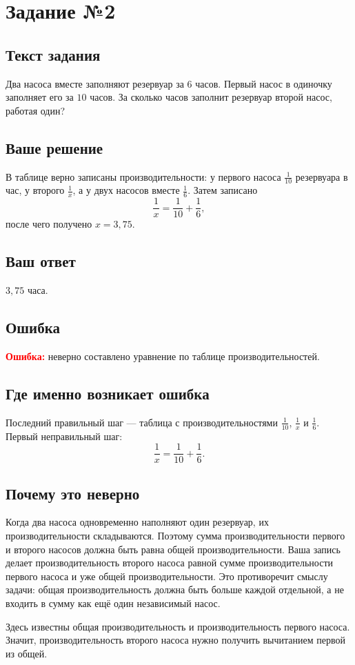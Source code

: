 \documentclass[12pt,a4paper]{article}
\newcommand{\err}{\textcolor{red}{\textbf{Ошибка:}}}
\newcommand{\tasksection}[1]{\section*{Задание №#1}}
\begin{document}
\label{task:2}
\tasksection{2}
\subsection*{Текст задания}
Два насоса вместе заполняют резервуар за $6$ часов. Первый насос в одиночку заполняет его за $10$ часов. За сколько часов заполнит резервуар второй насос, работая один?

\subsection*{Ваше решение}
В таблице верно записаны производительности: у первого насоса $\frac{1}{10}$ резервуара в час, у второго $\frac{1}{x}$, а у двух насосов вместе $\frac{1}{6}$. Затем записано
\[
\frac{1}{x}=\frac{1}{10}+\frac{1}{6},
\]
после чего получено $x=3{,}75$.

\subsection*{Ваш ответ}
$3{,}75$ часа.

\subsection*{Ошибка}
\err{} неверно составлено уравнение по таблице производительностей.

\subsection*{Где именно возникает ошибка}
Последний правильный шаг --- таблица с производительностями $\frac{1}{10}$, $\frac{1}{x}$ и $\frac{1}{6}$. Первый неправильный шаг:
\[
\frac{1}{x}=\frac{1}{10}+\frac{1}{6}.
\]

\subsection*{Почему это неверно}
Когда два насоса одновременно наполняют один резервуар, их производительности складываются. Поэтому сумма производительности первого и второго насосов должна быть равна общей производительности. Ваша запись делает производительность второго насоса равной сумме производительности первого насоса и уже общей производительности. Это противоречит смыслу задачи: общая производительность должна быть больше каждой отдельной, а не входить в сумму как ещё один независимый насос.

Здесь известны общая производительность и производительность первого насоса. Значит, производительность второго насоса нужно получить вычитанием первой из общей.
\end{document}
